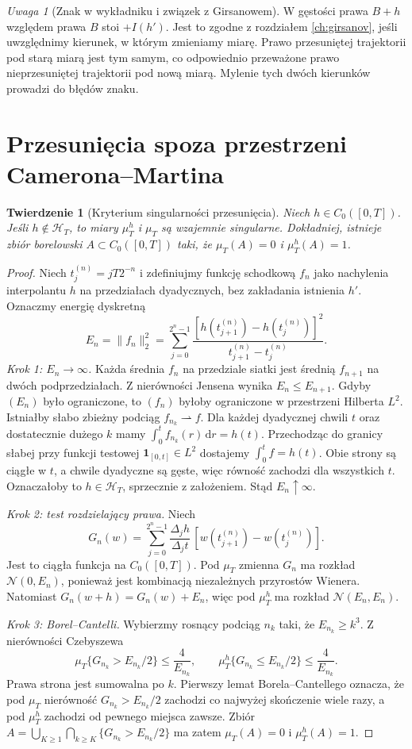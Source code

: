 \documentclass[11pt,a4paper,oneside]{report}
\numberwithin{equation}{chapter}
\theoremstyle{plain}
\newtheorem{twierdzenie}{Twierdzenie}[chapter]
\theoremstyle{definition}
\theoremstyle{remark}
\newtheorem{uwaga}{Uwaga}[chapter]
\newcommand{\calH}{\mathcal{H}}
\newcommand{\ind}[1]{\mathbf{1}_{#1}}
\newcommand{\dd}{\mathrm{d}}
\newcommand{\Normal}{\mathcal{N}}
\begin{document}
\begin{uwaga}[Znak w wykładniku i związek z Girsanowem]
W gęstości prawa $B+h$ względem prawa $B$ stoi
$+I(h')$. Jest to zgodne z rozdziałem \ref{ch:girsanov},
jeśli uwzględnimy kierunek, w którym zmieniamy miarę.
Prawo przesuniętej trajektorii pod starą miarą jest tym
samym, co odpowiednio przeważone prawo nieprzesuniętej
trajektorii pod nową miarą. Mylenie tych dwóch kierunków
prowadzi do błędów znaku.
\end{uwaga}

\section{Przesunięcia spoza przestrzeni Camerona--Martina}

\begin{twierdzenie}[Kryterium singularności przesunięcia]
\label{th:cm-singular}
Niech $h\in C_0([0,T])$. Jeśli $h\notin\calH_T$,
to miary $\mu_T^h$ i $\mu_T$ są wzajemnie singularne.
Dokładniej, istnieje zbiór borelowski $A\subset C_0([0,T])$
taki, że $\mu_T(A)=0$ i $\mu_T^h(A)=1$.
\end{twierdzenie}
\begin{proof}
Niech $t_j^{(n)}=jT2^{-n}$ i zdefiniujmy funkcję
schodkową $f_n$ jako nachylenia interpolantu $h$ na
przedziałach dyadycznych, bez zakładania istnienia $h'$.
Oznaczmy energię dyskretną
\[
E_n=\|f_n\|_2^2=
\sum_{j=0}^{2^n-1}\frac{[h(t_{j+1}^{(n)})-h(t_j^{(n)})]^2}
{t_{j+1}^{(n)}-t_j^{(n)}}.
\]
\emph{Krok 1: $E_n\to\infty$.} Każda średnia $f_n$ na
przedziale siatki jest średnią $f_{n+1}$ na dwóch
podprzedziałach. Z nierówności Jensena wynika
$E_n\le E_{n+1}$. Gdyby $(E_n)$ było ograniczone,
to $(f_n)$ byłoby ograniczone w przestrzeni Hilberta $L^2$.
Istniałby słabo zbieżny podciąg $f_{n_k}\rightharpoonup f$.
Dla każdej dyadycznej chwili $t$ oraz dostatecznie dużego $k$
mamy $\int_0^t f_{n_k}(r)\,\dd r=h(t)$.
Przechodząc do granicy słabej przy funkcji testowej
$\ind{[0,t]}\in L^2$ dostajemy $\int_0^t f=h(t)$.
Obie strony są ciągłe w $t$, a chwile dyadyczne są gęste,
więc równość zachodzi dla wszystkich $t$.
Oznaczałoby to $h\in\calH_T$, sprzecznie z założeniem.
Stąd $E_n\uparrow\infty$.

\emph{Krok 2: test rozdzielający prawa.} Niech
\[
G_n(w)=\sum_{j=0}^{2^n-1}\frac{\Delta_j h}{\Delta_j t}
\,[w(t_{j+1}^{(n)})-w(t_j^{(n)})].
\]
Jest to ciągła funkcja na $C_0([0,T])$.
Pod $\mu_T$ zmienna $G_n$ ma rozkład $\Normal(0,E_n)$,
ponieważ jest kombinacją niezależnych przyrostów Wienera.
Natomiast $G_n(w+h)=G_n(w)+E_n$, więc pod $\mu_T^h$
ma rozkład $\Normal(E_n,E_n)$.

\emph{Krok 3: Borel--Cantelli.} Wybierzmy rosnący podciąg
$n_k$ taki, że $E_{n_k}\ge k^3$.
Z nierówności Czebyszewa
\[
\mu_T\{G_{n_k}>E_{n_k}/2\}\le\frac4{E_{n_k}},\qquad
\mu_T^h\{G_{n_k}\le E_{n_k}/2\}\le\frac4{E_{n_k}}.
\]
Prawa strona jest sumowalna po $k$. Pierwszy lemat
Borela--Cantellego oznacza, że pod $\mu_T$ nierówność
$G_{n_k}>E_{n_k}/2$ zachodzi co najwyżej skończenie wiele razy,
a pod $\mu_T^h$ zachodzi od pewnego miejsca zawsze.
Zbiór
$A=\bigcup_{K\ge1}\bigcap_{k\ge K}\{G_{n_k}>E_{n_k}/2\}$
ma zatem $\mu_T(A)=0$ i $\mu_T^h(A)=1$.
\end{proof}
\end{document}
